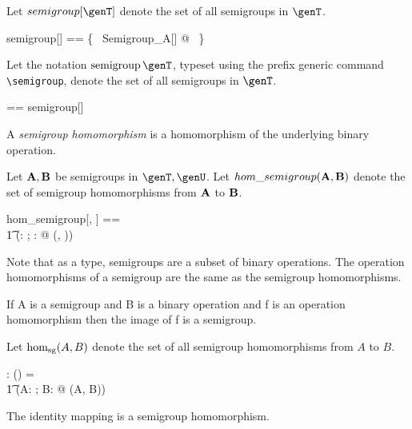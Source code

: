 \documentclass{amsart}
\begin{document}
Let $semigroup[\genT]$ denote the set of all semigroups in $\genT$.

\begin{zed}
	semigroup[\genT] == \{~ Semigroup\_A[\genT] @ \strucA  ~\}
\end{zed}

Let the notation $\semigroup \genT$, typeset using the prefix generic command \verb|\semigroup|,
denote the set of all semigroups in $\genT$.

\begin{zed}
	\semigroup \genT == semigroup[\genT]
\end{zed}

\begin{remark}
\begin{zed}
	\semigroup \setT \subseteq \binop \setT
\end{zed}
\end{remark}

A \textit{semigroup homomorphism} is a homomorphism of the underlying binary operation.

Let $\mathbf{A}, \mathbf{B}$ be semigroups in $\genT, \genU$.
Let $hom\_semigroup(\mathbf{A}, \mathbf{B})$ denote the set of semigroup homomorphisms from $\mathbf{A}$ to $\mathbf{B}$.

\begin{zed}
	hom\_semigroup[\genT, \genU] == \\
	\t1	(\lambda \strucA: \semigroup \genT; \strucB: \semigroup \genU @ \homBinOp(\strucA, \strucB))
\end{zed}

Note that as a type, semigroups are a subset of binary operations.
The operation homomorphisms of a semigroup are the same as the semigroup homomorphisms.

If A is a semigroup and B is a binary operation and f is an operation homomorphism then the image of f is a semigroup.

Let $\operatorname{hom_{sg}}(A, B)$ denote the set of all semigroup homomorphisms from $A$ to $B$.

\begin{gendef}[\genT, \genU]
	\homSemigroup: \semigroup \genT \cross \semigroup \genU \fun \power (\genT \pfun \genU)
\where
	\homSemigroup = \\
	\t1	(\lambda A: \semigroup \genT; B: \semigroup \genU @ \homBinOp(A, B))
\end{gendef}

\begin{remark}
The identity mapping is a semigroup homomorphism.
\end{remark}
\end{document}
